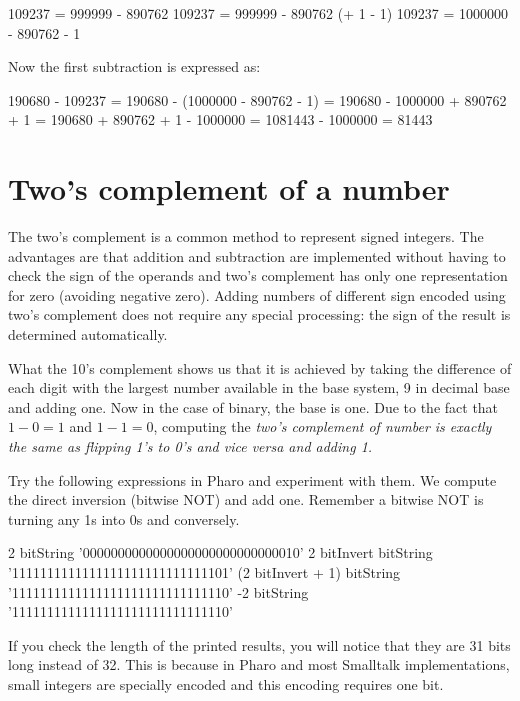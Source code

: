 \documentclass[a4paper,10pt,twoside]{book}
\begin{document}
\begin{code}{}
109237 = 999999 - 890762
109237 = 999999 - 890762 (+ 1 - 1)
109237 = 1000000 - 890762 - 1
\end{code}

Now the first subtraction is expressed as:
\begin{code}{}
190680 - 109237
= 190680 - (1000000 - 890762 - 1)
= 190680 - 1000000 + 890762 + 1
= 190680  + 890762 + 1 - 1000000
= 1081443 - 1000000
= 81443
\end{code}


\section{Two's complement of a number}

The two's complement is a common method to represent signed integers. The advantages are that addition and subtraction are implemented without having to  check the sign of the operands and two's complement has only one representation for zero (avoiding negative zero). Adding numbers of different sign encoded using two's complement does not  require any special processing: the sign of the result is determined automatically. 

What the 10's complement shows us  that it is achieved by taking the difference of each digit with the largest number available in the base system, 9 in decimal base and adding one. Now in the case of binary, the base is one.
Due to the fact that $1 - 0 = 1$ and $1 - 1 = 0$, computing the \emph{two's complement of number is exactly the same as flipping 1's to 0's and vice versa and adding 1.}


Try the following expressions in Pharo and experiment with them. We compute the direct inversion (bitwise NOT) and add one. 
Remember a bitwise NOT is turning any 1s into 0s and conversely. 

\begin{code}{}
2 bitString 
			'0000000000000000000000000000010'
2 bitInvert bitString 
			'1111111111111111111111111111101'
(2 bitInvert + 1) bitString 
			'1111111111111111111111111111110'
-2 bitString 
			'1111111111111111111111111111110'		 
\end{code}

If you check the length of the printed results, you will notice that they are 31 bits long instead of 32. This is because in Pharo and most Smalltalk implementations, small integers are specially encoded and this encoding requires one bit.
\end{document}
